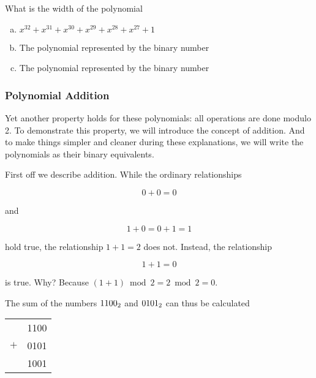 \begin{Exercise}[label={width-poly}]

  What is the width of the polynomial

  \begin{enumerate}[(a)]
  \item $x^{32} + x^{31} + x^{30} + x^{29} + x^{28} + x^{27} + 1 $
  \item The polynomial represented by the binary number 
  \item The polynomial represented by the binary number 
  \end{enumerate}

\end{Exercise}

\subsubsection{Polynomial Addition}

Yet another property holds for these polynomials: all operations are
done modulo 2. To demonstrate this property, we will introduce the
concept of addition. And to make things simpler and cleaner during
these explanations, we will write the polynomials as their binary
equivalents.

First off we describe addition. While the ordinary relationships

\begin{equation*}
  0 + 0 = 0
\end{equation*}

and

\begin{equation*}
  1 + 0 = 0 + 1 = 1
\end{equation*}

hold true, the relationship $1 + 1 = 2$
does not. Instead, the relationship

\begin{equation*}
  1 + 1 = 0
\end{equation*}

is true. Why? Because $(1 + 1) \bmod 2 = 2 \bmod 2 = 0$.

The sum of the numbers $\mbox{\ensuremath{1100_2}}$ and $\mbox{\ensuremath{0101_2}}$ can thus be calculated

\begin{center}
  \begin{tabular}{lr}
    & 1100  \\
    $+$ & 0101 \\
    \hline
    & 1001 \\
  \end{tabular}
\end{center}

